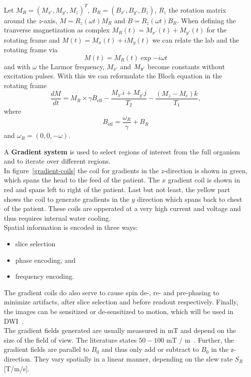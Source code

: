 Let $M_{R} = \left( M_{x'}, M_{y'}, M_z \right)^T$, $B_R = \left( B_{x'}, B_{y'}, B_z \right)$, $R_z$ the rotation matrix around the $z$-axis, $M = R_z(\omega t) M_R$ and $B = R_z(\omega t) B_R$.
When defining the tranverse magnetization as complex $M_R(t) = M_{x'}(t) + M_{y'}(t)$ for the rotating frame and $M(t) = M_x(t) + i M_y(t)$ we can relate the lab and the rotating frame via
\[ M(t) = M_R(t) \exp{-i \omega t} \]
and with $\omega$ the Larmor frequency, $M_{x'}$ and $M_{y`}$ become constants without excitation pulses.
With this we can reformulate the Bloch equation in the rotating frame
\[ \frac{dM}{dt} = M_R \times \gamma B_{\text{eff}} - \frac{M_{x'} i + M_{y'} j}{T_2} - \frac{(M_z - M_e) k }{T_1}, \]
where \[ B_{\text{eff}} = \frac{\omega_R}{\gamma} + B_R \] and $\omega_R = \left( 0, 0, - \omega \right)$.


A \textbf{Gradient system} is used to select regions of interest from the full organism and to iterate over different regions. \\
In figure~\ref{gradient-coils} the coil for gradients in the $z$-direction is shown in green, which spans the head to the feed of the patient.
The $x$ gradient coil is shown in red and spans left to right of the patient.
Last but not least, the yellow part shows the coil to generate gradients in the $y$ direction which spans back to chest of the patient.
These coils are opperated at a very high current and voltage and thus requires internal water cooling. \\

Spatial information is encoded in three ways:
\begin{itemize}
 \item slice selection
 \item phase encoding, and
 \item frequency encoding.
\end{itemize}
The gradient coils do also serve to cause spin de-, re- and pre-phasing to minimize artifacts, after slice selection and before readout respectively.
Finally, the images can be sensitized or de-sensitized to motion, which will be used in DWI~\autocite{bernstein_handbook_2004}. \\

The gradient fields generated are usually meassured in mT and depend on the size of the field of view.
The literature states $50-100$ mT $/$ m~\autocite{bernstein_handbook_2004}.
Further, the gradient fields are parallel to $B_0$ and thus only add or subtract to $B_0$ in the z-direction.
They vary spatially in a linear manner, depending on the slew rate $S_R$ [T/m/s].

